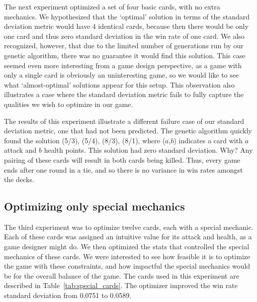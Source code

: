 The next experiment optimized a set of four basic cards, with no extra mechanics. We hypothesized that the `optimal' solution in terms of the standard deviation metric would have 4 identical cards, because then there would be only one card and thus zero standard deviation in the win rate of one card. We also recognized, however, that due to the limited number of generations run by our genetic algorithm, there was no guarantee it would find this solution. This case seemed even more interesting from a game design perspective, as a game with only a single card is obviously an uninteresting game, so we would like to see what `almost-optimal' solutions appear for this setup. This observation also illustrates a case where the standard deviation metric fails to fully capture the qualities we wish to optimize in our game.

The results of this experiment illustrate a different failure case of our standard deviation metric, one that had not been predicted. The genetic algorithm quickly found the solution (5/3), (5/4), (8/3), (8/1), where ($a$,$b$) indicates a card with $a$ attack and $b$ health points. This solution had zero standard deviation. Why? Any pairing of these cards will result in both cards being killed. Thus, every game ends after one round in a tie, and so there is no variance in win rates amongst the decks. 

 \subsection{Optimizing only special mechanics}

The third experiment was to optimize twelve cards, each with a special mechanic. Each of these cards was assigned an intuitive value for its attack and health, as a game designer might do. We then optimized the stats that controlled the special mechanics of these cards. We were interested to see how feasible it is to optimize the game with these constraints, and how impactful the special mechanics would be for the overall balance of the game. The cards used in this experiment are described in Table~\ref{tab:special_cards}. The optimizer improved the win rate standard deviation from 0.0751 to 0.0589. 

